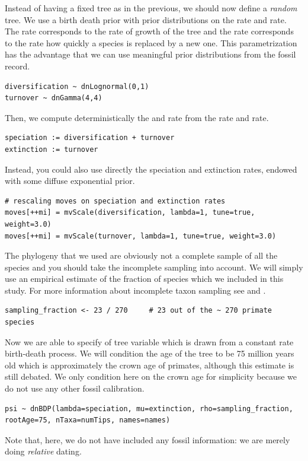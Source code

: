 Instead of having a fixed tree as in the previous, we should now define a \emph{random} tree. We use a birth death prior with prior distributions on the  rate and  rate.
The  rate corresponds to the rate of growth of the tree and the  rate corresponds to the rate how quickly a species is replaced by a new one.
This parametrization has the advantage that we can use meaningful prior distributions from the fossil record.
{\tt \small \begin{snugshade*}
\begin{lstlisting}
diversification ~ dnLognormal(0,1)
turnover ~ dnGamma(4,4)
\end{lstlisting}
\end{snugshade*}}
Then, we compute deterministically the  and  rate from the  rate and  rate.
{\tt \small \begin{snugshade*}
\begin{lstlisting}
speciation := diversification + turnover
extinction := turnover
\end{lstlisting}
\end{snugshade*}}
Instead, you could also use directly the speciation and extinction rates, \EG endowed with some diffuse exponential prior.
{\tt \small \begin{snugshade*}
\begin{lstlisting}
# rescaling moves on speciation and extinction rates
moves[++mi] = mvScale(diversification, lambda=1, tune=true, weight=3.0)
moves[++mi] = mvScale(turnover, lambda=1, tune=true, weight=3.0)
\end{lstlisting}
\end{snugshade*}}
The phylogeny that we used are obviously not a complete sample of all the species and you should take the incomplete sampling into account. We will simply use an empirical estimate of the fraction of species which we included in this study. For more information about incomplete taxon sampling see \cite{Hohna2011} and \cite{Hohna2014a}. 
{\tt \small \begin{snugshade*}
\begin{lstlisting}
sampling_fraction <- 23 / 270     # 23 out of the ~ 270 primate species
\end{lstlisting}
\end{snugshade*}}
Now we are able to specify of tree variable  which is drawn from a constant rate birth-death process. We will condition the age of the tree to be 75 million years old which is approximately the crown age of primates, although this estimate is still debated. We only condition here on the crown age for simplicity because we do not use any other fossil calibration.
{\tt \small \begin{snugshade*}
\begin{lstlisting}
psi ~ dnBDP(lambda=speciation, mu=extinction, rho=sampling_fraction, rootAge=75, nTaxa=numTips, names=names)
\end{lstlisting}
\end{snugshade*}}
Note that, here, we do not have included any fossil information: we are merely doing \emph{relative} dating. 

